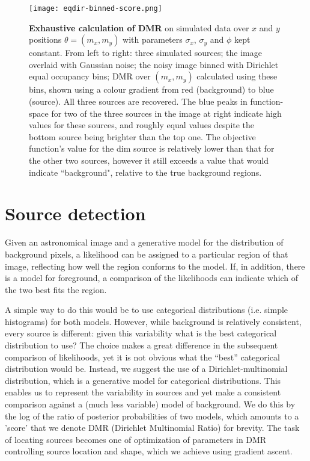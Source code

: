 \documentclass[
    ,final            %
  ]
  {aipproc}
\begin{document}
\begin{figure}[hbt]
\centering
\texttt{[image: eqdir-binned-score.png]} 
\caption{\textbf{Exhaustive calculation of DMR} on simulated data over $x$ and $y$ positions $\theta = (m_x, m_y)$ with parameters $\sigma_x$,  $\sigma_y$ and $\phi$ kept constant. From left to right: three simulated sources; the image overlaid with Gaussian noise; the noisy image binned with Dirichlet equal occupancy bins; DMR over $(m_x,m_y)$ calculated using these bins, shown using a colour gradient from red (background) to blue (source). All three sources are recovered. The blue peaks in function-space for two of the three sources in the image at right indicate high values for these sources, and roughly equal values despite the bottom source being brighter than the top one. The objective function's value for the dim source is relatively lower than that for the other two sources, however it still exceeds a value that would indicate ``background", relative to the true background regions.} 
\label{fig:eqdir-binned-score}
\end{figure}

\section{Source detection} 
Given an astronomical image and a generative model for the
distribution of background pixels, a likelihood can be assigned to a
particular region of that image, reflecting how well the region
conforms to the model. If, in addition, there is a model for
foreground, a comparison of the likelihoods can indicate which of the
two best fits the region.

A simple way to do this would be to use categorical distributions
(i.e. simple histograms) for both models. However, while background is relatively
consistent, every source is different: given this variability
what is the best categorical distribution to use? The choice makes a
great difference in the subsequent comparison of likelihoods, yet it
is not obvious what the ``best'' categorical distribution would be.
Instead, we suggest the use of a Dirichlet-multinomial distribution,
which is a generative model for categorical distributions. This
enables us to represent the variability in sources and yet make a
consistent comparison against a (much less variable) model of
background.  We do this by the log of the ratio of posterior
probabilities of two models, which amounts to a 'score' that we denote
DMR (Dirichlet Multinomial Ratio) for brevity.  The task of locating sources
becomes one of optimization of parameters in DMR controlling source
location and shape, which we achieve using gradient ascent.
\end{document}
